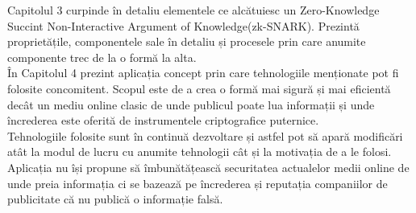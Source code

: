Capitolul 3 curpinde în detaliu elementele ce alcătuiesc un Zero-Knowledge Succint Non-Interactive Argument of Knowledge(zk-SNARK). Prezintă proprietățile, componentele sale în detaliu și procesele prin care anumite componente trec de la o formă la alta.\\

În Capitolul 4 prezint aplicația concept prin care tehnologiile menționate pot fi folosite concomitent. Scopul este de a crea o formă mai sigură și mai eficientă decât un mediu online clasic de unde publicul poate lua informații și unde încrederea este oferită de instrumentele criptografice puternice.\\

Tehnologiile folosite sunt în continuă dezvoltare și astfel pot să apară modificări atât la modul de lucru cu anumite tehnologii cât și la motivația de a le folosi. Aplicația nu își propune să îmbunătățească securitatea actualelor medii online de unde preia informația ci se bazează pe încrederea și reputația companiilor de publicitate că nu publică o informație falsă.\\